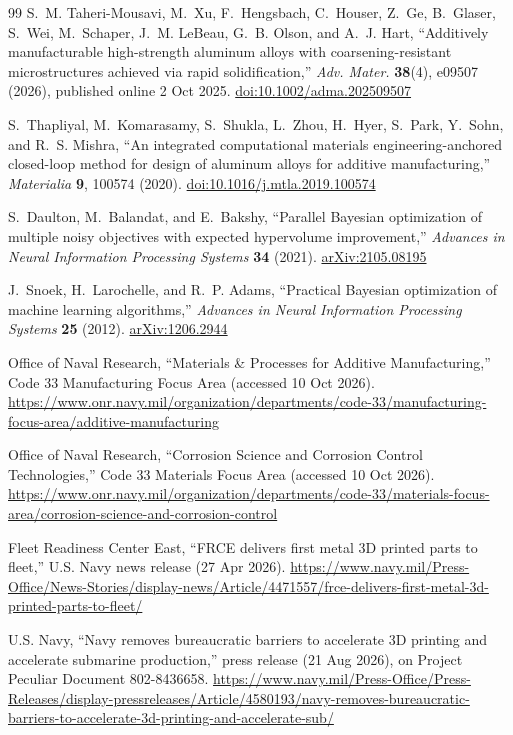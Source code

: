 \documentclass[12pt,letterpaper]{article}
\begin{document}
\begin{thebibliography}{99}
S.~M. Taheri-Mousavi, M.~Xu, F.~Hengsbach, C.~Houser, Z.~Ge, B.~Glaser,
S.~Wei, M.~Schaper, J.~M. LeBeau, G.~B. Olson, and A.~J. Hart, ``Additively
manufacturable high-strength aluminum alloys with coarsening-resistant
microstructures achieved via rapid solidification,'' \emph{Adv. Mater.}
\textbf{38}(4), e09507 (2026), published online 2 Oct 2025.
\href{https://doi.org/10.1002/adma.202509507}{doi:10.1002/adma.202509507}

S.~Thapliyal, M.~Komarasamy, S.~Shukla, L.~Zhou, H.~Hyer, S.~Park, Y.~Sohn,
and R.~S. Mishra, ``An integrated computational materials engineering-anchored
closed-loop method for design of aluminum alloys for additive
manufacturing,'' \emph{Materialia} \textbf{9}, 100574 (2020).
\href{https://doi.org/10.1016/j.mtla.2019.100574}{doi:10.1016/j.mtla.2019.100574}

S.~Daulton, M.~Balandat, and E.~Bakshy, ``Parallel Bayesian optimization of
multiple noisy objectives with expected hypervolume improvement,''
\emph{Advances in Neural Information Processing Systems} \textbf{34} (2021).
\href{https://arxiv.org/abs/2105.08195}{arXiv:2105.08195}

J.~Snoek, H.~Larochelle, and R.~P. Adams, ``Practical Bayesian optimization of
machine learning algorithms,'' \emph{Advances in Neural Information Processing
Systems} \textbf{25} (2012).
\href{https://arxiv.org/abs/1206.2944}{arXiv:1206.2944}

Office of Naval Research, ``Materials \& Processes for Additive
Manufacturing,'' Code 33 Manufacturing Focus Area (accessed 10 Oct 2026).
\url{https://www.onr.navy.mil/organization/departments/code-33/manufacturing-focus-area/additive-manufacturing}

Office of Naval Research, ``Corrosion Science and Corrosion Control
Technologies,'' Code 33 Materials Focus Area (accessed 10 Oct 2026).
\url{https://www.onr.navy.mil/organization/departments/code-33/materials-focus-area/corrosion-science-and-corrosion-control}

Fleet Readiness Center East, ``FRCE delivers first metal 3D printed parts to
fleet,'' U.S. Navy news release (27 Apr 2026).
\url{https://www.navy.mil/Press-Office/News-Stories/display-news/Article/4471557/frce-delivers-first-metal-3d-printed-parts-to-fleet/}

U.S. Navy, ``Navy removes bureaucratic barriers to accelerate 3D printing and
accelerate submarine production,'' press release (21 Aug 2026), on Project
Peculiar Document 802-8436658.
\url{https://www.navy.mil/Press-Office/Press-Releases/display-pressreleases/Article/4580193/navy-removes-bureaucratic-barriers-to-accelerate-3d-printing-and-accelerate-sub/}


\end{thebibliography}
\end{document}
